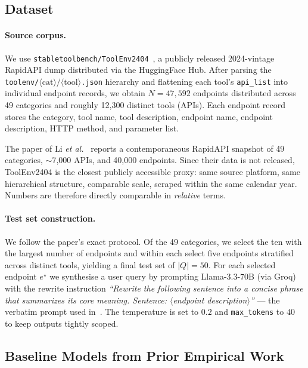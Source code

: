 \documentclass[10pt,a4paper,twocolumn]{article}
\begin{document}
\subsection{Dataset}

\paragraph{Source corpus.} We use
\texttt{stabletoolbench/ToolEnv2404}~\cite{stabletoolbench2024}, a
publicly released 2024-vintage RapidAPI dump distributed via the
HuggingFace Hub. After parsing the
\texttt{toolenv/}$\langle\mathrm{cat}\rangle/\langle\mathrm{tool}\rangle$\texttt{.json}
hierarchy and flattening each tool's \texttt{api\_list} into individual
endpoint records, we obtain
\(N=47{,}592\) endpoints distributed across 49 categories and roughly
12{,}300 distinct tools (APIs). Each endpoint record stores the
category, tool name, tool description, endpoint name, endpoint
description, HTTP method, and parameter list.

The paper of Li \textit{et al.}~\cite{li2025llm} reports a
contemporaneous RapidAPI snapshot of 49 categories, $\sim$7{,}000 APIs,
and 40{,}000 endpoints. Since their data is not released, ToolEnv2404
is the closest publicly accessible proxy: same source platform, same
hierarchical structure, comparable scale, scraped within the same
calendar year. Numbers are therefore directly comparable in
\emph{relative} terms.

\paragraph{Test set construction.} We follow the paper's exact
protocol. Of the 49 categories, we select the ten with the largest
number of endpoints and within each select five endpoints stratified
across distinct tools, yielding a final test set of $|Q|=50$. For
each selected endpoint \(e^{\star}\) we synthesise a user query by
prompting Llama-3.3-70B (via Groq) with the rewrite instruction
\emph{``Rewrite the following sentence into a concise phrase that
summarizes its core meaning. Sentence:
\(\langle\)endpoint description\(\rangle\)''} --- the verbatim prompt
used in~\cite{li2025llm}. The temperature is set to $0.2$ and
\texttt{max\_tokens} to $40$ to keep outputs tightly scoped.

\subsection{Baseline Models from Prior Empirical Work}
\end{document}
